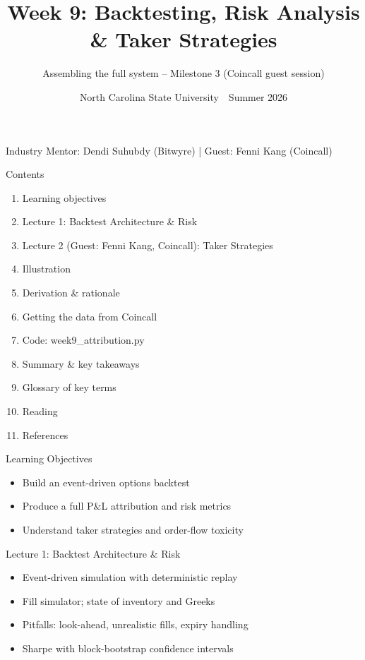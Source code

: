 \documentclass[aspectratio=169,10pt]{beamer}
\title{Week 9: Backtesting, Risk Analysis \& Taker Strategies}
\subtitle{Assembling the full system -- Milestone 3 (Coincall guest session)}
\date{North Carolina State University \,\textbar\, Summer 2026}
\begin{document}
\begin{frame}[plain]\titlepage\begin{center}\tiny Industry Mentor: Dendi Suhubdy (Bitwyre)  |  Guest: Fenni Kang (Coincall)\end{center}\end{frame}
\begin{frame}{Contents}
\small\begin{enumerate}\setlength{\itemsep}{3pt}
  \item Learning objectives
  \item Lecture 1: Backtest Architecture \& Risk
  \item Lecture 2 (Guest: Fenni Kang, Coincall): Taker Strategies
  \item Illustration
  \item Derivation \& rationale
  \item Getting the data from Coincall
  \item Code: week9\_attribution.py
  \item Summary \& key takeaways
  \item Glossary of key terms
  \item Reading
  \item References
\end{enumerate}
\end{frame}

\begin{frame}{Learning Objectives}
\begin{itemize}
  \item Build an event-driven options backtest
  \item Produce a full P\&L attribution and risk metrics
  \item Understand taker strategies and order-flow toxicity
\end{itemize}
\end{frame}

\begin{frame}{Lecture 1: Backtest Architecture \& Risk}
\begin{itemize}
  \item Event-driven simulation with deterministic replay
  \item Fill simulator; state of inventory and Greeks
  \item Pitfalls: look-ahead, unrealistic fills, expiry handling
  \item Sharpe with block-bootstrap confidence intervals
\end{itemize}
\end{frame}
\end{document}
